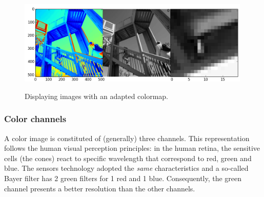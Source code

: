 \begin{figure}[H]
\centering\caption{Displaying images with an adapted colormap.}%
 \includegraphics[height=4cm]{subplots.png}%
 \label{fig:introduction:python:display}%
\end{figure}

\subsubsection{Color channels}
A color image is constituted of (generally) three channels. This representation follows the human visual perception principles: in the human retina, the sensitive cells (the cones) react to specific wavelength that correspond to red, green and blue. The sensors technology adopted the \textit{same} characteristics and a so-called Bayer filter has 2 green filters for 1 red and 1 blue. Consequently, the green channel presents a better resolution than the other channels.


